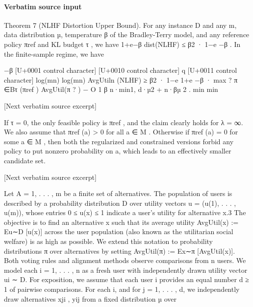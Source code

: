 \documentclass[10pt]{article}
\begin{document}
\paragraph{Verbatim source input}
\begin{ReviewVerbatim}
Theorem 7 (NLHF Distortion Upper Bound). For any instance D and any m, data distribution µ,
temperature β of the Bradley-Terry model, and any reference policy πref and KL budget τ , we have
                   1+e−β
dist(NLHF) ≤ β2 · 1−e −β . In the finite-sample regime, we have

                             −β [U+0001 control character]
                                                                          [U+0010 control character] q                           [U+0011 control character]
                                                                                  log(mn)       log(mn)
AvgUtiln (NLHF) ≥ β2 · 1−e
                         1+e −β    · max   ?
                                          π ∈Bτ (πref ) AvgUtil(π ?
                                                                    ) − O  1
                                                                           β  n·min{1, d·µ2 }
                                                                                              + n·βµ 2    .
                                                                                                     min         min


[Next verbatim source excerpt]

      If τ = 0, the only feasible policy is πref , and the claim clearly holds for λ = ∞. We also assume that
πref (a) > 0 for all a ∈ M . Otherwise if πref (a) = 0 for some a ∈ M , then both the regularized and constrained
versions forbid any policy to put nonzero probability on a, which leads to an effectively smaller candidate set.

[Next verbatim source excerpt]

Let A = {1, . . . , m} be a finite set of alternatives. The population of users is described by a
probability distribution D over utility vectors u = (u(1), . . . , u(m)), whose entries 0 ≤ u(x) ≤ 1
indicate a user’s utility for alternative x.3 The objective is to find an alternative x such that its average
utility AvgUtil(x) := Eu∼D [u(x)] across the user population (also known as the utilitarian social
welfare) is as high as possible. We extend this notation to probability distributions π over alternatives
by setting AvgUtil(π) := Ex∼π [AvgUtil(x)].
Both voting rules and alignment methods observe comparisons from n users. We model each
i = 1, . . . , n as a fresh user with independently drawn utility vector ui ∼ D. For exposition, we
assume that each user i provides an equal number d ≥ 1 of pairwise comparisons. For each i,
and for j = 1, . . . , d, we independently draw alternatives xji , yij from a fixed distribution µ over


\end{ReviewVerbatim}
\end{document}
